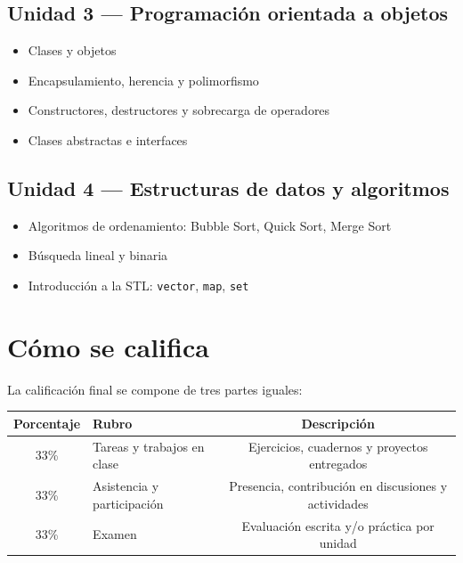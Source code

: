 \documentclass[12pt, oneside]{article}
\begin{document}
\subsection{Unidad 3 — Programación orientada a objetos}
\begin{itemize}
  \item Clases y objetos
  \item Encapsulamiento, herencia y polimorfismo
  \item Constructores, destructores y sobrecarga de operadores
  \item Clases abstractas e interfaces
\end{itemize}

\subsection{Unidad 4 — Estructuras de datos y algoritmos}
\begin{itemize}
  \item Algoritmos de ordenamiento: Bubble Sort, Quick Sort, Merge Sort
  \item Búsqueda lineal y binaria
  \item Introducción a la STL: \texttt{vector}, \texttt{map}, \texttt{set}
\end{itemize}

\section{Cómo se califica}

La calificación final se compone de tres partes iguales:

\begin{center}
\begin{tabular}{clc}
  \toprule
  \textbf{Porcentaje} & \textbf{Rubro} & \textbf{Descripción} \\
  \midrule
  33\% & Tareas y trabajos en clase
        & Ejercicios, cuadernos y proyectos entregados \\
  33\% & Asistencia y participación
        & Presencia, contribución en discusiones y actividades \\
  33\% & Examen
        & Evaluación escrita y/o práctica por unidad \\
  \bottomrule
\end{tabular}
\end{center}
\end{document}
